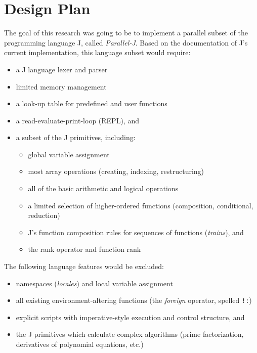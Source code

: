 \section{Design Plan}
\label{desp}
The goal of this research was going to be
to implement a parallel subset of the programming language J, called \textit{Parallel-J}.
Based on the documentation of J's current implementation\cite{ioj}, this language subset would require:
\begin{itemize}
	\item a J language lexer and parser
	\item limited memory management
	\item a look-up table for predefined and user functions
	\item a read-evaluate-print-loop (REPL), and
	\item a subset of the J primitives, including: 
	\begin{itemize}
		\item global variable assignment
		\item most array operations (creating, indexing, restructuring)
		\item all of the basic arithmetic and logical operations
		\item a limited selection of higher-ordered functions (composition, conditional, reduction)
		\item J's function composition rules for sequences of functions (\textit{trains}), and
		\item the rank operator and function rank
	\end{itemize}
\end{itemize}
\noindent
The following language features would be excluded:
\begin{itemize}
	\item namespaces (\textit{locales}) and local variable assignment
	\item all existing environment-altering functions (the \textit{foreign} operator, spelled \texttt{!:})
	\item explicit scripts with imperative-style execution and control structure, and
	\item the J primitives which calculate complex algorithms (prime factorization, derivatives of polynomial equations, etc.)
\end{itemize}

